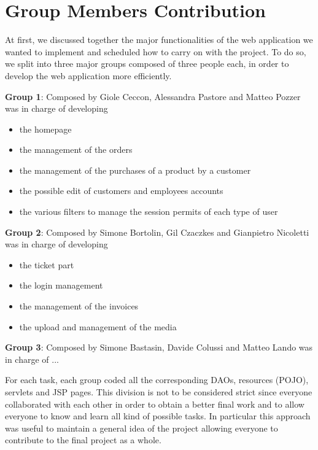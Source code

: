 \section{Group Members Contribution}

At first, we discussed together the major functionalities of the web application we wanted to implement and scheduled how to carry on with the project.
To do so, we split into three major groups composed of three people each, in order to develop the web application more efficiently.


\begin{description}
	\item \textbf{Group 1}: Composed by Giole Ceccon, Alessandra Pastore and Matteo Pozzer was in charge of developing
	\begin{itemize}
		\item the homepage
		\item the management of the orders
		\item the management of the purchases of a product by a customer
		\item the possible edit of customers and employees accounts
		\item the various filters to manage the session permits of each type of user
	\end{itemize} 
	\item \textbf{Group 2}: Composed by Simone Bortolin, Gil Czaczkes and Gianpietro Nicoletti was in charge of developing
	\begin{itemize}
		\item the ticket part
		\item the login management
		\item the management of the invoices
		\item the upload and management of the media
	\end{itemize}
	\item \textbf{Group 3}: Composed by Simone Bastasin, Davide Colussi and Matteo Lando was in charge of ...

For each task, each group coded all the corresponding DAOs, resources (POJO), servlets and JSP pages.
This division is not to be considered strict since everyone collaborated with each other in order to obtain a better final work 
and to allow everyone to know and learn all kind of possible tasks. 
In particular this approach was useful to maintain a general idea of the project allowing everyone to contribute to the final project as a whole.

\end{description}